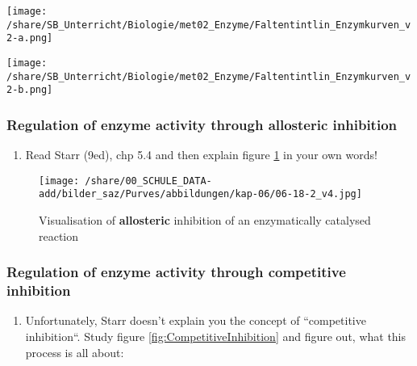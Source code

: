 		\enlargethispage{1.6cm}
			    \begin{minipage}{0.48\textwidth}
			     \centering
			      \texttt{[image: /share/SB\_Unterricht/Biologie/met02\_Enzyme/Faltentintlin\_Enzymkurven\_v2-a.png]}
			        \label{fig:ADH-Kurve}
			    \end{minipage}\hfill
			    \begin{minipage}{0.48\textwidth}
			     \centering
			      \texttt{[image: /share/SB\_Unterricht/Biologie/met02\_Enzyme/Faltentintlin\_Enzymkurven\_v2-b.png]}
			         \label{fig:ALDH-Kurve}
			    \end{minipage}

\clearpage


\subsubsection{Regulation of enzyme activity through allosteric inhibition }
	\begin{enumerate}[resume, leftmargin=*]
\item  Read  Starr (9ed), chp 5.4 and then explain figure \ref{fig:AllostericInhibition} in your own words! \\
\end{enumerate}

		\begin{figure}[htp]
		  \texttt{[image: /share/00\_SCHULE\_DATA-add/bilder\_saz/Purves/abbildungen/kap-06/06-18-2\_v4.jpg]}
		  \caption[allosteric inhibition, Purves chp 6 fig 06-18-2]{Visualisation of \textbf{allosteric} inhibition of an enzymatically catalysed reaction}
		  \label{fig:AllostericInhibition}
		\end{figure}

\subsubsection{Regulation of enzyme activity through competitive inhibition }
	\begin{enumerate}[resume, leftmargin=*]
\item  Unfortunately, Starr doesn't explain you the concept of ``competitive inhibition``. Study figure \ref{fig:CompetitiveInhibition} and figure out, what this process is all about:\\
\end{enumerate}				

